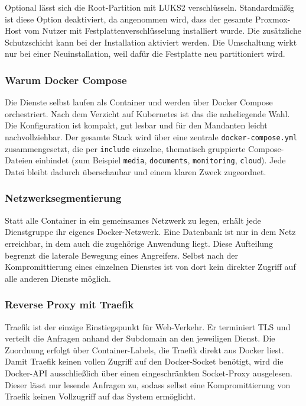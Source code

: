 Optional lässt sich die Root-Partition mit \ac{LUKS}2 verschlüsseln. \label{sec:LUKS2_apphost}
Standardmäßig ist diese Option deaktiviert, da angenommen wird, dass der
gesamte Proxmox-Host vom Nutzer mit Festplattenverschlüsselung installiert
wurde. Die zusätzliche Schutzschicht kann bei der Installation aktiviert
werden. Die Umschaltung wirkt nur bei einer Neuinstallation, weil dafür die
Festplatte neu partitioniert wird.

\subsubsection{Warum Docker Compose}
Die Dienste selbst laufen als Container und werden über Docker Compose
orchestriert. Nach dem Verzicht auf Kubernetes ist das die naheliegende Wahl.
Die Konfiguration ist kompakt, gut lesbar und für den Mandanten leicht
nachvollziehbar. Der gesamte Stack wird über eine zentrale
\texttt{docker-compose.yml} zusammengesetzt, die per \texttt{include}
einzelne, thematisch gruppierte Compose-Dateien einbindet (zum Beispiel
\texttt{media}, \texttt{documents}, \texttt{monitoring}, \texttt{cloud}).
Jede Datei bleibt dadurch überschaubar und einem klaren Zweck zugeordnet.

\subsubsection{Netzwerksegmentierung}
\label{sec:apphost-netze}
Statt alle Container in ein gemeinsames Netzwerk zu legen, erhält jede
Dienstgruppe ihr eigenes Docker-Netzwerk. Eine Datenbank ist nur in dem Netz
erreichbar, in dem auch die zugehörige Anwendung liegt. Diese Aufteilung
begrenzt die laterale Bewegung eines Angreifers. Selbst nach der
Kompromittierung eines einzelnen Dienstes ist von dort kein direkter Zugriff
auf alle anderen Dienste möglich.


\subsubsection{Reverse Proxy mit Traefik}
Traefik ist der einzige Einstiegspunkt für Web-Verkehr. Er terminiert
\ac{TLS} und verteilt die Anfragen anhand der Subdomain an den jeweiligen
Dienst. Die Zuordnung erfolgt über Container-Labels, die Traefik direkt aus
Docker liest. Damit Traefik keinen vollen Zugriff auf den Docker-Socket
benötigt, wird die Docker-\ac{API} ausschließlich über einen eingeschränkten
Socket-Proxy ausgelesen. Dieser lässt nur lesende Anfragen zu, sodass selbst
eine Kompromittierung von Traefik keinen Vollzugriff auf das System
ermöglicht.


